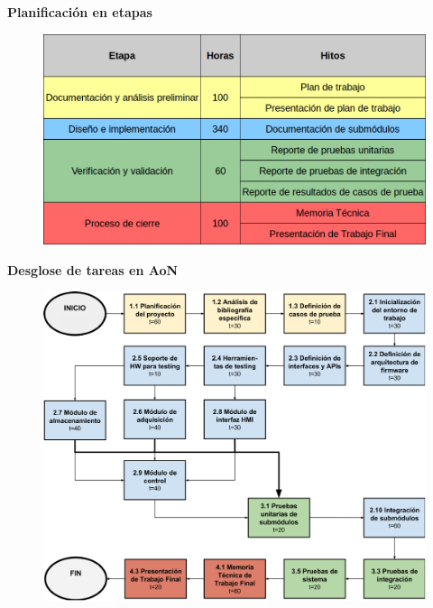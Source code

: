 \documentclass[11pt]{beamer}
\begin{document}
\begin{frame}{\textbf{\LARGE{Planificación en etapas}}}
	\vspace{-.7cm}
	\begin{figure}[H]
		{\includegraphics[width=\textwidth]{./imagenes/planificacion.png}}
	\end{figure}	
\end{frame}

\begin{frame}{\textbf{\LARGE{Desglose de tareas en AoN}}}
	\vspace{-.7cm}
	\begin{figure}[H]
		{\includegraphics[height=.8\textheight]{./imagenes/AoN.pdf}}
	\end{figure}	
\end{frame}

\end{document}

